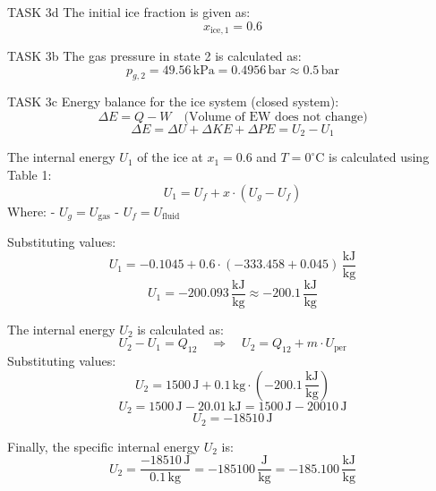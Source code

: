 TASK 3d  
The initial ice fraction is given as:  
\[
x_{\text{ice},1} = 0.6
\]

TASK 3b  
The gas pressure in state 2 is calculated as:  
\[
p_{g,2} = 49.56 \, \text{kPa} = 0.4956 \, \text{bar} \approx 0.5 \, \text{bar}
\]

TASK 3c  
Energy balance for the ice system (closed system):  
\[
\Delta E = Q - W \quad \text{(Volume of EW does not change)}
\]  
\[
\Delta E = \Delta U + \Delta KE + \Delta PE = U_2 - U_1
\]

The internal energy \( U_1 \) of the ice at \( x_1 = 0.6 \) and \( T = 0^\circ\text{C} \) is calculated using Table 1:  
\[
U_1 = U_f + x \cdot (U_g - U_f)
\]  
Where:  
- \( U_g = U_{\text{gas}} \)  
- \( U_f = U_{\text{fluid}} \)  

Substituting values:  
\[
U_1 = -0.1045 + 0.6 \cdot (-333.458 + 0.045) \, \frac{\text{kJ}}{\text{kg}}
\]  
\[
U_1 = -200.093 \, \frac{\text{kJ}}{\text{kg}} \approx -200.1 \, \frac{\text{kJ}}{\text{kg}}
\]

The internal energy \( U_2 \) is calculated as:  
\[
U_2 - U_1 = Q_{12} \quad \Rightarrow \quad U_2 = Q_{12} + m \cdot U_{\text{per}}
\]  
Substituting values:  
\[
U_2 = 1500 \, \text{J} + 0.1 \, \text{kg} \cdot (-200.1 \, \frac{\text{kJ}}{\text{kg}})
\]  
\[
U_2 = 1500 \, \text{J} - 20.01 \, \text{kJ} = 1500 \, \text{J} - 20010 \, \text{J}
\]  
\[
U_2 = -18510 \, \text{J}
\]

Finally, the specific internal energy \( U_2 \) is:  
\[
U_2 = \frac{-18510 \, \text{J}}{0.1 \, \text{kg}} = -185100 \, \frac{\text{J}}{\text{kg}} = -185.100 \, \frac{\text{kJ}}{\text{kg}}
\]